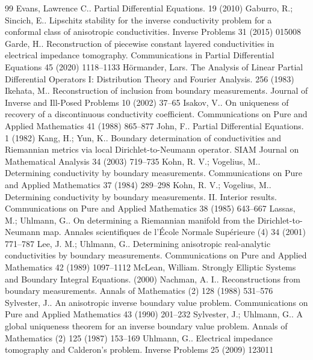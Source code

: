 \documentclass[10pt,a4paper]{amsart}
\begin{document}
\begin{thebibliography}{99}
 Evans, Lawrence C.. Partial Differential Equations. 19 (2010)
 Gaburro, R.; Sincich, E.. Lipschitz stability for the inverse conductivity problem for a conformal class of anisotropic conductivities. Inverse Problems 31 (2015) 015008
 Garde, H.. Reconstruction of piecewise constant layered conductivities in electrical impedance tomography. Communications in Partial Differential Equations 45 (2020) 1118--1133
 H{\"o}rmander, Lars. The Analysis of Linear Partial Differential Operators {I}: Distribution Theory and Fourier Analysis. 256 (1983)
 Ikehata, M.. Reconstruction of inclusion from boundary measurements. Journal of Inverse and Ill-Posed Problems 10 (2002) 37--65
 Isakov, V.. On uniqueness of recovery of a discontinuous conductivity coefficient. Communications on Pure and Applied Mathematics 41 (1988) 865--877
 John, F.. Partial Differential Equations. 1 (1982)
 Kang, H.; Yun, K.. Boundary determination of conductivities and {Riemannian} metrics via local {Dirichlet-to-Neumann} operator. SIAM Journal on Mathematical Analysis 34 (2003) 719--735
 Kohn, R. V.; Vogelius, M.. Determining conductivity by boundary measurements. Communications on Pure and Applied Mathematics 37 (1984) 289--298
 Kohn, R. V.; Vogelius, M.. Determining conductivity by boundary measurements. {II}. Interior results. Communications on Pure and Applied Mathematics 38 (1985) 643--667
 Lassas, M.; Uhlmann, G.. On determining a {Riemannian} manifold from the {Dirichlet-to-Neumann} map. Annales scientifiques de l'{\'E}cole Normale Sup{\'e}rieure (4) 34 (2001) 771--787
 Lee, J. M.; Uhlmann, G.. Determining anisotropic real-analytic conductivities by boundary measurements. Communications on Pure and Applied Mathematics 42 (1989) 1097--1112
 McLean, William. Strongly Elliptic Systems and Boundary Integral Equations. (2000)
 Nachman, A. I.. Reconstructions from boundary measurements. Annals of Mathematics (2) 128 (1988) 531--576
 Sylvester, J.. An anisotropic inverse boundary value problem. Communications on Pure and Applied Mathematics 43 (1990) 201--232
 Sylvester, J.; Uhlmann, G.. A global uniqueness theorem for an inverse boundary value problem. Annals of Mathematics (2) 125 (1987) 153--169
 Uhlmann, G.. Electrical impedance tomography and {Calderon's} problem. Inverse Problems 25 (2009) 123011
\end{thebibliography}
\end{document}

